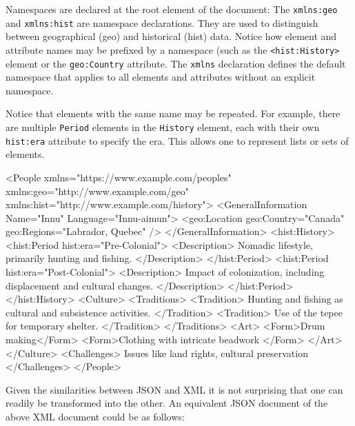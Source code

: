 Namespaces are declared at the root element of the document: The \texttt{xmlns:geo} and \texttt{xmlns:hist} are namespace declarations. They are used to distinguish between geographical (geo) and historical (hist) data. Notice how element and attribute names may be prefixed by a namespace (such as the \texttt{<hist:History>} element or the \texttt{geo:Country} attribute. The \texttt{xmlns} declaration defines the default namespace that applies to all elements and attributes without an explicit namespace.

Notice that elements with the same name may be repeated. For example, there are multiple \texttt{Period} elements in the \texttt{History} element, each with their own \texttt{hist:era} attribute to specify the era. This allows one to represent lists or sets of elements. 

\begin{samepage}
\begin{xmlcode}
<People
      xmlns="https://www.example.com/peoples"
      xmlns:geo="http://www.example.com/geo" 
      xmlns:hist="http://www.example.com/history">
    <GeneralInformation 
            Name="Innu" Language="Innu-aimun">
        <geo:Location geo:Country="Canada" 
                  geo:Regions="Labrador, Quebec" />
    </GeneralInformation>
    <hist:History>
        <hist:Period hist:era="Pre-Colonial">
            <Description>
                Nomadic lifestyle, primarily 
                hunting and fishing.
            </Description>
        </hist:Period>
        <hist:Period hist:era="Post-Colonial">
            <Description>
                Impact of colonization, 
                including displacement and 
                cultural changes.
            </Description>
        </hist:Period>
    </hist:History>
    <Culture>
        <Traditions>
            <Tradition>
                Hunting and fishing as cultural 
                and subsistence activities.
            </Tradition>
            <Tradition>
                Use of the tepee for temporary 
                shelter.
            </Tradition>
        </Traditions>
        <Art>
            <Form>Drum making</Form>
            <Form>Clothing with intricate beadwork
            </Form>
        </Art>
    </Culture>
    <Challenges>
        Issues like land rights, cultural preservation
    </Challenges>
</People>
\end{xmlcode}
\end{samepage}

Given the similarities between JSON and XML it is not surprising that one can readily be transformed into the other. An equivalent JSON document of the above XML document could be as follows:

